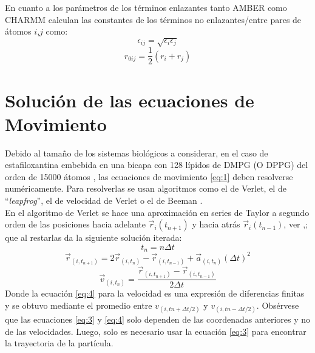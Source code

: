 En cuanto a los par\'{a}metros de los t\'{e}rminos enlazantes tanto AMBER como CHARMM calculan las constantes de los t\'{e}rminos no enlazantes/entre pares de \'{a}tomos $i$,$j$ como:
\begin{equation}\label{eq:9}
   \epsilon_{ij}=\sqrt{\epsilon_{i}\epsilon_{j}}
\end{equation}
\begin{equation}\label{eq:10}
   r_{0ij}=\frac{1}{2}\left(r_i+r_j\right)
\end{equation}
\section{Soluci\'{o}n de las ecuaciones de Movimiento}
Debido al tama\~no de los sistemas biol\'{o}gicos a considerar, en el caso de estafiloxantina embebida en una bicapa con 128 l\'{i}pidos de DMPG (O DPPG) del orden de 15000 \'{a}tomos \cite{MelendezDelgado2018StudyingBilayers}, las ecuaciones de movimiento \eqref{eq:1} deben resolverse num\'{e}ricamente. Para resolverlas se usan algoritmos como el de Verlet, el de ``\textit{leapfrog}'', el de velocidad de Verlet o el de Beeman \cite{Mazur1997CommonRevisited}.\\
En el algoritmo de Verlet se hace una aproximaci\'{o}n en series de Taylor a segundo orden de las posiciones hacia adelante $\vec{r}_{i}(t_{n+1})$ y hacia atr\'{a}s $\vec{r}_{i}(t_{n-1})$, ver \cite{MelendezDelgado2018StudyingBilayers},\cite{Mazur1997CommonRevisited}; que al restarlas da la siguiente soluci\'{o}n iterada:
\begin{equation}\label{eq:2}
t_{n}=n\Delta t
\end{equation}
\begin{equation}\label{eq:3}
\vec{r}_{(i,t_{n+1})}=2\vec{r}_{(i,t_{n})}-\vec{r}_{(i,t_{n-1})}+\vec{a}_{(i,t_{n})}(\Delta t)^2
\end{equation}
\begin{equation}\label{eq:4}
\vec{v}_{(i,t_{n})}=\frac{\vec{r}_{(i,t_{n+1})}-\vec{r}_{(i,t_{n-1})}}{2\Delta t}
\end{equation}
Donde la ecuaci\'{o}n \eqref{eq:4} para la velocidad es una expresi\'{o}n de diferencias finitas y se obtuvo mediante el promedio entre $v_{(i,tn+\Delta t/2)}$ y $v_{(i,tn-\Delta t/2)}$.
Obs\'{e}rvese que las ecuaciones \eqref{eq:3} y \eqref{eq:4} solo dependen de las coordenadas anteriores y no de las velocidades. Luego, solo es necesario usar la ecuaci\'{o}n \eqref{eq:3} para encontrar la trayectoria de la part\'{i}cula.\\


